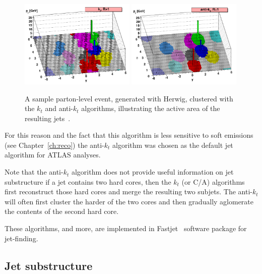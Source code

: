\begin{figure}[tp]
\centering
\includegraphics[width=0.49\textwidth]{areas_kt.png}
\includegraphics[width=0.49\textwidth]{areas-antikt.png}
\caption{A sample parton-level event, generated with {\sc Herwig}, clustered with the $k_t$ and anti-$k_t$ algorithms, illustrating the active area of the resulting jets~\cite{CatchmentArea}.}
\label{fig:CatchmentAreaFig}
\end{figure}


For this reason and the fact that this algorithm is less sensitive to soft emissions (see Chapter~\ref{ch:reco}) the anti-$k_t$ algorithm was chosen as the default jet algorithm for ATLAS analyses.

Note that the anti-$k_t$ algorithm does not provide useful information on jet substructure if a jet contains two hard cores, then the $k_t$ (or C/A) algorithms first reconstruct those hard cores and merge the resulting two subjets. The anti-$k_t$ will often first cluster the harder of the two cores and then gradually aglomerate the contents of the second hard core.

These algorithms, and more, are implemented in {\sc Fastjet}~\cite{fastjet} software package for jet-finding. 


\subsection{Jet substructure}\label{sec:substructure}

